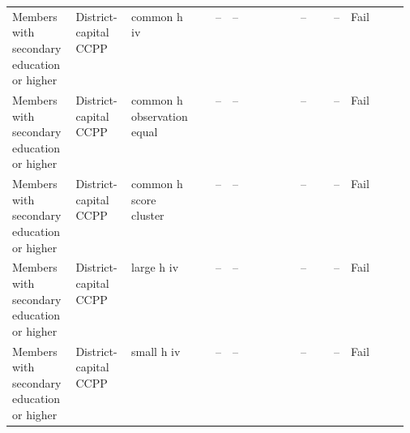 \begin{longtable}{@{}p{0.16\linewidth}p{0.14\linewidth}p{0.14\linewidth}rp{0.13\linewidth}rrl@{}}
Members with secondary education or higher & District-capital CCPP & common h iv & -- & -- & -- & -- & Fail \\
Members with secondary education or higher & District-capital CCPP & common h observation equal & -- & -- & -- & -- & Fail \\
Members with secondary education or higher & District-capital CCPP & common h score cluster & -- & -- & -- & -- & Fail \\
Members with secondary education or higher & District-capital CCPP & large h iv & -- & -- & -- & -- & Fail \\
Members with secondary education or higher & District-capital CCPP & small h iv & -- & -- & -- & -- & Fail \\
\end{longtable}
\endgroup
